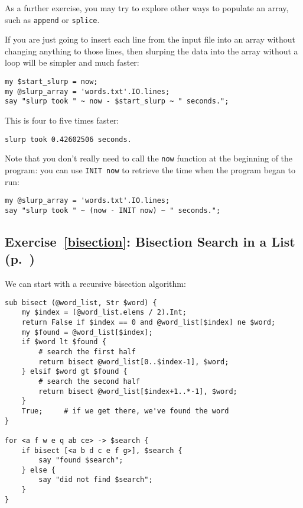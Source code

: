 As a further exercise, you may try to explore other 
ways to populate an array, such as {\tt append} or 
{\tt splice}.

If you are just going to insert each line from the 
input file into an array without changing anything to 
those lines, then slurping the data into the array 
without a loop will be simpler and much faster:

\begin{verbatim}
my $start_slurp = now;
my @slurp_array = 'words.txt'.IO.lines;
say "slurp took " ~ now - $start_slurp ~ " seconds.";
\end{verbatim}

This is four to five times faster:
\begin{verbatim}
slurp took 0.42602506 seconds.
\end{verbatim}

Note that you don't really need to call the \verb'now' 
function at the beginning of the program: you can use 
\verb'INIT now' to retrieve the time when the 
program began to run:

\begin{verbatim}
my @slurp_array = 'words.txt'.IO.lines;
say "slurp took " ~ (now - INIT now) ~ " seconds.";
\end{verbatim}

\subsection{Exercise~\ref{bisection}: Bisection Search in a List (p.~\pageref{bisection})}
\label{sol_bisection}

We can start with a recursive bisection algorithm:


\begin{verbatim}
sub bisect (@word_list, Str $word) {
    my $index = (@word_list.elems / 2).Int;
    return False if $index == 0 and @word_list[$index] ne $word;
    my $found = @word_list[$index];
    if $word lt $found {
        # search the first half
        return bisect @word_list[0..$index-1], $word;
    } elsif $word gt $found {
        # search the second half
        return bisect @word_list[$index+1..*-1], $word;
    }
    True;     # if we get there, we've found the word
}

for <a f w e q ab ce> -> $search { 
    if bisect [<a b d c e f g>], $search {
        say "found $search";
    } else {
        say "did not find $search";
    }
}
\end{verbatim}

